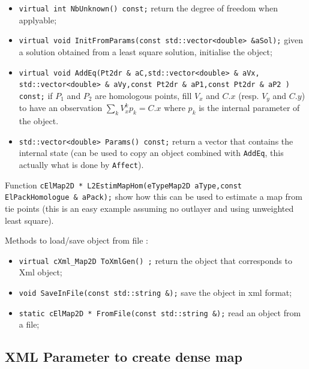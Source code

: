 \begin{itemize}
    \item {\tt virtual int   NbUnknown() const;} return the degree of freedom when applyable;

    \item {\tt   virtual void  InitFromParams(const std::vector<double> \&aSol);} given a solution obtained
          from a least square solution, initialise the object; 

    \item {\tt     virtual void  AddEq(Pt2dr \& aC,std::vector<double> \& aVx,
                   std::vector<double> \& aVy,const Pt2dr \& aP1,const Pt2dr \& aP2 ) const;}
          if $P_1$ and $P_2$ are homologous points, fill  $V_x$ and $C.x$ (resp. $V_y$ and $C.y$) 
          to have an observation $ \sum\limits_k V_x^k p_k = C.x $ where $p_k$  is the internal parameter
          of the object.

    \item {\tt   std::vector<double> Params() const;} return a vector that contains the internal
          state  (can be used to copy an object combined with {\tt AddEq}, this actually what is
          done by {\tt Affect}).
 
\end{itemize}

Function {\tt cElMap2D * L2EstimMapHom(eTypeMap2D aType,const ElPackHomologue \& aPack);} show how this
can be used to estimate a map from tie points (this is an easy example assuming no outlayer and
using unweighted least square).


Methods to load/save object from file :

\begin{itemize}
   \item {\tt virtual cXml\_Map2D    ToXmlGen() ;} return the \CPP object that corresponds to  
         Xml object;

   \item {\tt void  SaveInFile(const std::string \&);} save the object in xml format;

   \item {\tt  static cElMap2D * FromFile(const std::string \&);} read an object from a file;
\end{itemize}


\subsection{XML Parameter to create dense map}

